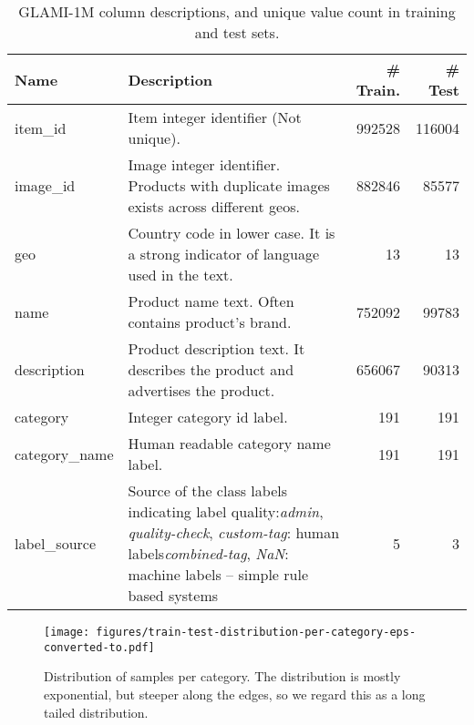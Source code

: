 \documentclass{bmvc2k}
\begin{document}
\begin{table}[htb]
\centering
\small
\setlength{\tabcolsep}{3pt}
\renewcommand{\arraystretch}{1.5}
\caption{\label{tab:columns} GLAMI-1M column descriptions, and unique value count in training and test sets.}
\vspace{1mm}
\begin{tabular}{ | m{1.9cm} | m{8.1cm} | r | r| }
\hline
          Name &                                                                                                                                                                                                                                                                           Description &  \# Train. &  \# Test \\
\hline
       item\_id &    Item integer identifier (Not unique). &   992528 &  116004 \\
      image\_id &       Image integer identifier. Products with duplicate images exists across different geos. &   882846 &   85577 \\
           geo &        Country code in lower case. It is a strong indicator of language used in the text. &       13 &      13 \\
          name &          Product name text. Often contains product's brand. &   752092 &  99783 \\
   description &        Product description text. It describes the product and advertises the product. &   656067 &   90313 \\
      category &        Integer category id label. &      191 &     191 \\
 category\_name &       Human readable category name label. &      191 &     191 \\
  label\_source &  Source of the class labels indicating label quality:\newline \textit{admin}, \textit{quality-check}, \textit{custom-tag}: human labels\newline \textit{combined-tag}, \textit{NaN}: machine labels -- simple rule based systems&        5 &       3 \\
\hline
\end{tabular}
\end{table}

\begin{figure}
\centering
\texttt{[image: figures/train-test-distribution-per-category-eps-converted-to.pdf]}
\vspace*{-6mm}
\caption{Distribution of samples per category.
The distribution is mostly exponential, but steeper along the edges, so we regard this as a long tailed distribution.
} \label{fig:category}
\end{figure}
\end{document}
